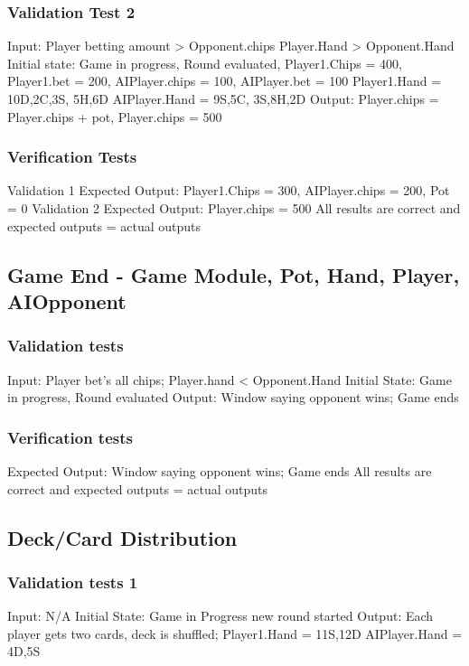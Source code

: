 \documentclass[11pt]{article}
\begin{document}
\subsubsection{Validation Test 2}
Input: Player betting amount > Opponent.chips Player.Hand > Opponent.Hand
Initial state: Game in progress, Round evaluated,
Player1.Chips = 400, Player1.bet = 200, AIPlayer.chips = 100, AIPlayer.bet = 100
Player1.Hand = 10D,2C,3S, 5H,6D AIPlayer.Hand = 9S,5C, 3S,8H,2D
Output: Player.chips = Player.chips + pot, Player.chips = 500

\subsubsection{Verification Tests}
Validation 1 Expected Output: Player1.Chips = 300, AIPlayer.chips = 200, Pot = 0
Validation 2 Expected Output: Player.chips = 500
All results are correct and expected outputs = actual outputs

\subsection{Game End - Game Module, Pot, Hand, Player, AIOpponent}

\subsubsection{Validation tests}
Input: Player bet’s all chips; Player.hand < Opponent.Hand
Initial State: Game in progress, Round evaluated
Output: Window saying opponent wins; Game ends

\subsubsection{Verification tests}
Expected Output: Window saying opponent wins; Game ends
All results are correct and expected outputs = actual outputs

\subsection{Deck/Card Distribution}

\subsubsection{Validation tests 1}
Input: N/A
Initial State: Game in Progress new round started
Output: Each player gets two cards, deck is shuffled; Player1.Hand = 11S,12D
AIPlayer.Hand = 4D,5S
\end{document}
